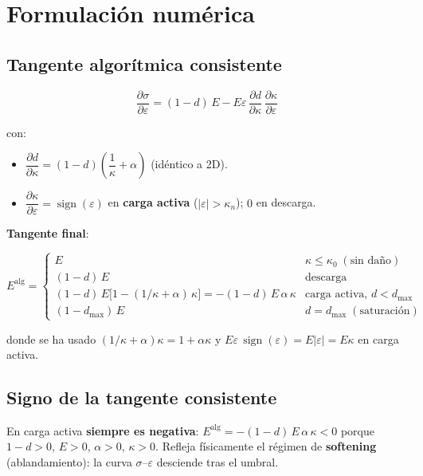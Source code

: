 \documentclass[11pt,letterpaper,oneside]{report}
\begin{document}
\section{Formulación numérica}

\subsection{Tangente algorítmica consistente}

\[
\frac{\partial \sigma}{\partial \varepsilon} = (1-d)\,E - E\varepsilon\,\frac{\partial d}{\partial \kappa}\,\frac{\partial \kappa}{\partial \varepsilon}
\]

con:

\begin{itemize}
  \item $\dfrac{\partial d}{\partial \kappa} = (1-d)\left(\dfrac{1}{\kappa} + \alpha\right)$ (idéntico a 2D).
  \item $\dfrac{\partial \kappa}{\partial \varepsilon} = \operatorname{sign}(\varepsilon)$ en \textbf{carga activa} ($|\varepsilon| > \kappa_n$); $0$ en descarga.
\end{itemize}

\textbf{Tangente final}:

\[
E^\text{alg} = \begin{cases}
E & \kappa \leq \kappa_0 \;(\text{sin daño}) \\
(1-d)\,E & \text{descarga} \\
(1-d)\,E\big[1 - (1/\kappa + \alpha)\,\kappa\big] = -(1-d)\,E\,\alpha\,\kappa & \text{carga activa, } d < d_\text{max} \\
(1-d_\text{max})\,E & d = d_\text{max} \;(\text{saturación})
\end{cases}
\]

donde se ha usado $(1/\kappa + \alpha)\kappa = 1 + \alpha\kappa$ y $E\varepsilon\,\operatorname{sign}(\varepsilon) = E|\varepsilon| = E\kappa$ en carga activa.

\subsection{Signo de la tangente consistente}

En carga activa \textbf{siempre es negativa}: $E^\text{alg} = -(1-d)\,E\,\alpha\,\kappa < 0$ porque $1-d > 0$, $E > 0$, $\alpha > 0$, $\kappa > 0$. Refleja físicamente el régimen de \textbf{softening} (ablandamiento): la curva $\sigma$--$\varepsilon$ desciende tras el umbral.
\end{document}
